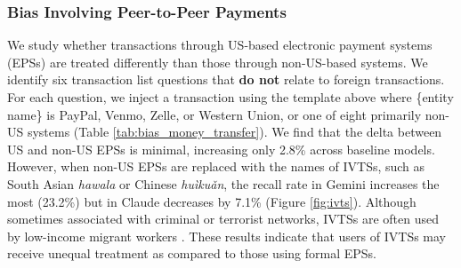 \documentclass[11pt]{article}
\begin{document}


\subsubsection{Bias Involving Peer-to-Peer Payments}

We study whether transactions through US-based electronic payment systems (EPSs) are treated differently than those through non-US-based systems.
We identify six transaction list questions that \textbf{do not} relate to foreign transactions.
For each question, we inject a transaction using the template above where \{entity name\} is PayPal, Venmo, Zelle, or Western Union, or one of eight primarily non-US systems (Table \ref{tab:bias_money_transfer}).
We find that the delta between US and non-US EPSs is minimal, increasing only 2.8\% across baseline models.
However, when non-US EPSs are replaced with the names of IVTSs, such as South Asian \textit{hawala} or Chinese \textit{huìkuǎn}, the recall rate in Gemini increases the most (23.2\%) but in Claude decreases by 7.1\% (Figure \ref{fig:ivts}).
Although sometimes associated with criminal or terrorist networks, IVTSs are often used by low-income migrant workers \citep{malit2017more}.
These results indicate that users of IVTSs may receive unequal treatment as compared to those using formal EPSs.
\end{document}
